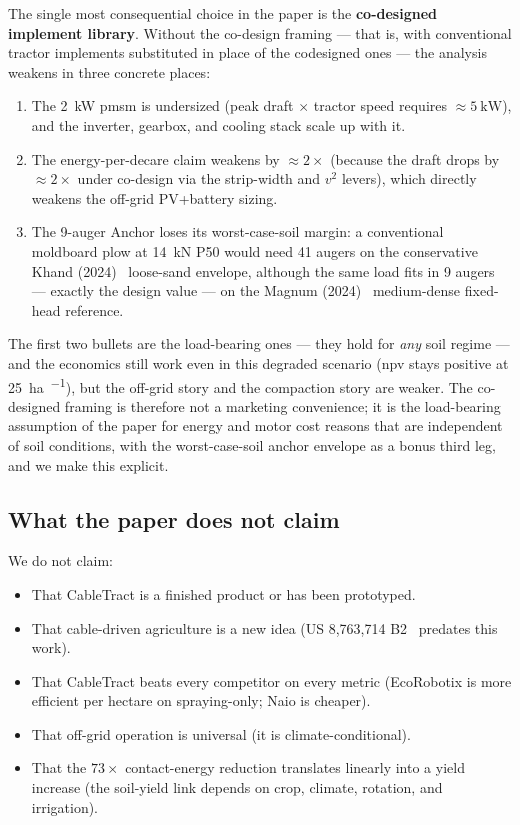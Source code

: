 \documentclass[11pt,a4paper]{article}
\begin{document}
The single most consequential choice in the paper is the \textbf{co-designed implement library}. Without the co-design framing --- that is, with conventional tractor implements substituted in place of the codesigned ones --- the analysis weakens in three concrete places:

\begin{enumerate}[leftmargin=1.6em,itemsep=0.1em]
    \item The \SI{2}{\kilo\watt} \gls{pmsm} is undersized (peak draft $\times$ tractor speed requires ${\approx}\SI{5}{\kilo\watt}$), and the inverter, gearbox, and cooling stack scale up with it.
    \item The energy-per-decare claim weakens by ${\approx}2\times$ (because the draft drops by ${\approx}2\times$ under co-design via the strip-width and $v^2$ levers), which directly weakens the off-grid PV+battery sizing.
    \item The 9-auger Anchor loses its worst-case-soil margin: a conventional moldboard plow at \SI{14}{\kilo\newton} P50 would need 41 augers on the conservative Khand (2024)~\cite{khand2024helical} loose-sand envelope, although the same load fits in 9 augers --- exactly the design value --- on the Magnum (2024)~\cite{magnum2024fixed} medium-dense fixed-head reference.
\end{enumerate}

The first two bullets are the load-bearing ones --- they hold for \emph{any} soil regime --- and the economics still work even in this degraded scenario (\gls{npv} stays positive at \SI{25}{\hectare\per\year}), but the off-grid story and the compaction story are weaker. The co-designed framing is therefore not a marketing convenience; it is the load-bearing assumption of the paper for energy and motor cost reasons that are independent of soil conditions, with the worst-case-soil anchor envelope as a bonus third leg, and we make this explicit.

\subsection{What the paper does not claim}\label{sec:not-claim}

We do not claim:

\begin{itemize}[leftmargin=1.6em,itemsep=0.1em]
    \item That CableTract is a finished product or has been prototyped.
    \item That cable-driven agriculture is a new idea (US 8,763,714 B2~\cite{orlando2014patent} predates this work).
    \item That CableTract beats every competitor on every metric (EcoRobotix is more efficient per hectare on spraying-only; Naio is cheaper).
    \item That off-grid operation is universal (it is climate-conditional).
    \item That the $73\times$ contact-energy reduction translates linearly into a yield increase (the soil-yield link depends on crop, climate, rotation, and irrigation).
\end{itemize}
\end{document}
